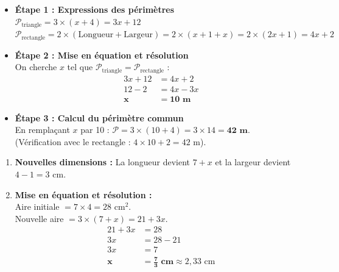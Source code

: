 \documentclass[a4paper]{book}
\begin{document}
    
    \begin{exercice}
        \begin{itemize}
            \item[$\bullet$] \textbf{Étape 1 : Expressions des périmètres} \\
            $\mathcal{P}_{\text{triangle}} = 3 \times (x + 4) = 3x + 12$ \\
            $\mathcal{P}_{\text{rectangle}} = 2 \times (\text{Longueur} + \text{Largeur}) = 2 \times (x + 1 + x) = 2 \times (2x + 1) = 4x + 2$
            
            \item[$\bullet$] \textbf{Étape 2 : Mise en équation et résolution} \\
            On cherche $x$ tel que $\mathcal{P}_{\text{triangle}} = \mathcal{P}_{\text{rectangle}}$ :
            \begin{align*}
                3x + 12 &= 4x + 2 \\
                12 - 2 &= 4x - 3x \\
                \mathbf{x} &\mathbf{= 10\text{ m}}
            \end{align*}
            
            \item[$\bullet$] \textbf{Étape 3 : Calcul du périmètre commun} \\
            En remplaçant $x$ par 10 : $\mathcal{P} = 3 \times (10 + 4) = 3 \times 14 = \mathbf{42\text{ m}}$. \\
            (Vérification avec le rectangle : $4 \times 10 + 2 = 42\text{ m}$).
        \end{itemize}
    \end{exercice}
    
    
    \begin{exercice}
        \begin{enumerate}
            \item \textbf{Nouvelles dimensions :} La longueur devient $7 + x$ et la largeur devient $4 - 1 = 3\text{ cm}$.
            \item \textbf{Mise en équation et résolution :} \\
            Aire initiale $= 7 \times 4 = 28\text{ cm}^2$. \\
            Nouvelle aire $= 3 \times (7 + x) = 21 + 3x$.
            \begin{align*}
                21 + 3x &= 28 \\
                3x &= 28 - 21 \\
                3x &= 7 \\
                \mathbf{x} &\mathbf{= \frac{7}{3}\text{ cm}} \approx 2,33\text{ cm}
            \end{align*}
        \end{enumerate}
    \end{exercice}
    
\end{document}
